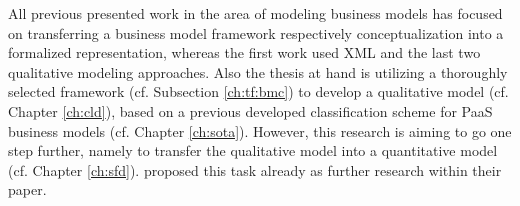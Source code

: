 All previous presented work in the area of modeling business models has focused on transferring a business model framework respectively conceptualization into a formalized representation, whereas the first work used \ac{XML} and the last two qualitative modeling approaches. Also the thesis at hand is utilizing a thoroughly selected framework (cf. Subsection \ref{ch:tf:bmc}) to develop a qualitative model (cf. Chapter \ref{ch:cld}), based on a previous developed classification scheme for \ac{PaaS} business models (cf. Chapter \ref{ch:sota}). However, this research is aiming to go one step further, namely to transfer the qualitative model into a quantitative model (cf. Chapter \ref{ch:sfd}). \citet{Kiani2009} proposed this task already as further research within their paper.